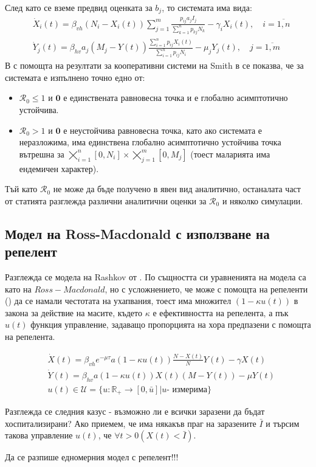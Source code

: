 След като се вземе предвид оценката за $b_j$, то системата има вида:
\begin{equation}
  \label{eq:MigrationProblem}
  \begin{split}
    &\dot{X}_i(t) = \beta_{vh} (N_i - X_i(t)) \sum_{j=1}^{m} \frac{p_{ij} a_j I_j}{\sum_{k=1}^n p_{kj} N_k} - \gamma_i X_i(t), \quad i=\overline{1, n} \\
    &\dot{Y}_j(t) = \beta_{hv} a_j (M_j - Y(t)) \frac{\sum_{i=1}^n p_{ij} X_i(t)}{\sum_{i=1}^n p_{ij} N_i} - \mu_j Y_j(t), \quad j=\overline{1, m}
  \end{split}
  \end{equation}
В \cite{Bichara2016} с помощта на резултати за кооперативни системи на Smith в \cite{Smith1986} се показва, че за системата е изпълнено точно едно от:
\begin{itemize}
  \item $\mathscr{R}_0 \leq 1$ и $\mathbf{0}$ е единствената равновесна точка и е глобално асимптотично устойчива.
  \item $\mathscr{R}_0 > 1$ и $\mathbf{0}$ е неустойчива равновесна точка, като ако системата е неразложима, има единствена глобално асимптотично устойчива точка вътрешна за $\bigtimes_{i=1}^{n} [0, N_i] \times \bigtimes_{j=1}^{m} [0, M_j]$ (тоест маларията има ендемичен характер).
\end{itemize}

Тъй като $\mathscr{R}_0$ не може да бъде получено в явен вид аналитично, останалата част от статията \cite{Bichara2016} разглежда различни аналитични оценки за $\mathscr{R}_0$ и няколко симулации.

\subsection{Модел на Ross-Macdonald с използване на репелент}
Разглежда се модела на Rashkov от \cite{Rashkov2019}. По същността си уравненията на модела са като на $Ross-Macdonald$, но с усложнението, че може с помощта на репеленти (\cite{Grancaric2019}) да се намали честотата на ухапвания, тоест има множител $(1 - \kappa u(t))$ в закона за действие на масите, където $\kappa$ е ефективността на репелента, а пък $u(t)$ функция управление, задаващо пропорцията на хора предпазени с помощта на репелента.

\begin{equation}
  \label{eq:RepelentProblem}
  \begin{split}
    &\dot{X}(t) = \beta_{vh} e^{-\mu \tau} a (1-\kappa u(t)) \frac{N-X(t)}{N} Y(t) - \gamma X(t) \\
    &\dot{Y}(t) = \beta_{hv} a (1-\kappa u(t)) X(t) (M-Y(t)) - \mu Y(t) \\
    &u(t) \in \mathscr{U} = \{u:\mathbb{R}_+ \rightarrow [0, \bar{u}] \vert u \text{- измерима}\}
  \end{split}
\end{equation}

Разглежда се следния казус - възможно ли е всички заразени да бъдат хоспитализирани? Ако приемем, че има някакъв праг на заразените $\bar{I}$ и търсим такова управление $u(t)$, че $\forall t>0 (X(t) < \bar{I})$.

\color{Red} Да се разпише едномерния модел с репелент!!!
\color{Black} \\
